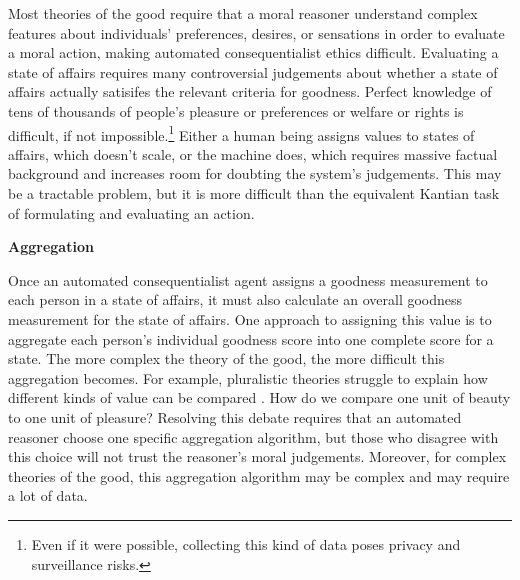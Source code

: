 \begin{isabellebody}
\begin{isamarkuptext}
Most theories of the good require that a moral reasoner understand complex features about
individuals' preferences, desires, or sensations in order to evaluate a moral action, making automated
consequentialist ethics difficult. Evaluating a state of affairs requires many controversial
judgements about whether a state of affairs actually satisifes the relevant criteria for goodness. 
Perfect knowledge of tens of thousands of people's pleasure or preferences or welfare or rights is 
difficult, if not impossible.\footnote{Even if it were possible, collecting this kind of data poses 
privacy and surveillance risks.} Either a human being 
assigns values to states of affairs, which doesn't scale, or the machine does, 
which requires massive factual background and increases room for doubting the system's judgements. This may be 
a tractable problem, but it is more difficult than the equivalent Kantian task of formulating
and evaluating an action.%
\end{isamarkuptext}\isamarkuptrue%
%
\begin{isamarkuptext}%
\noindent \textbf{Aggregation}%
\end{isamarkuptext}\isamarkuptrue%
%
\begin{isamarkuptext}%
Once an automated consequentialist agent assigns a goodness measurement to each person in a state of affairs, it 
must also calculate an overall goodness measurement for the state of affairs. One approach to assigning
this value is to aggregate each person's individual goodness score into one complete score for a state. 
The more complex the theory of the good, the more difficult this aggregation becomes. For example, 
pluralistic theories struggle to explain how different kinds of value can be compared \citep{consequentialismsep}. 
How do we compare one unit of beauty to one unit of pleasure? Resolving this debate requires that an automated reasoner 
choose one specific aggregation algorithm, but those who disagree with this choice will not trust 
the reasoner's moral judgements. Moreover, for complex theories of the good, this aggregation algorithm
may be complex and may require a lot of data. 


\end{isamarkuptext}
\end{isabellebody}
